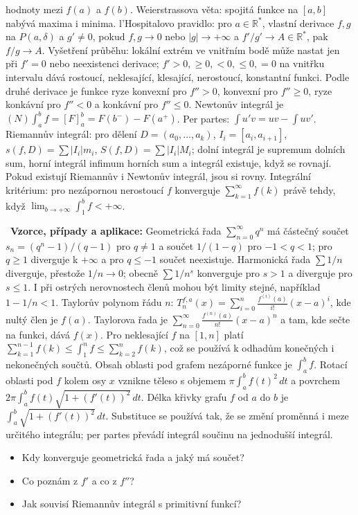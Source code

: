 \begin{odpoved}
hodnoty mezi $f(a)$ a $f(b)$. Weierstrassova věta: spojitá funkce na $[a,b]$ nabývá
maxima i minima. l'Hospitalovo pravidlo: pro $a\in\mathbb R^*$, vlastní derivace
$f,g$ na $P(a,\delta)$ a $g'\ne0$, pokud $f,g\to0$ nebo $|g|\to+\infty$ a
$f'/g'\to A\in\mathbb R^*$, pak $f/g\to A$. Vyšetření průběhu: lokální extrém ve
vnitřním bodě může nastat jen při $f'=0$ nebo neexistenci derivace; $f'>0,\ge0,<0,\le0,=0$
na vnitřku intervalu dává rostoucí, neklesající, klesající, nerostoucí, konstantní funkci.
Podle druhé derivace je funkce ryze konvexní pro $f''>0$, konvexní pro $f''\ge0$,
ryze konkávní pro $f''<0$ a konkávní pro $f''\le0$. Newtonův integrál je
$(N)\int_a^b f=[F]_a^b=F(b^-)-F(a^+)$. Per partes: $\int u'v=uv-\int uv'$.
Riemannův integrál: pro dělení $D=(a_0,\ldots,a_k)$, $I_i=[a_i,a_{i+1}]$,
$s(f,D)=\sum |I_i|m_i$, $S(f,D)=\sum |I_i|M_i$; dolní integrál je supremum dolních sum,
horní integrál infimum horních sum a integrál existuje, když se rovnají. Pokud existují
Riemannův i Newtonův integrál, jsou si rovny. Integrální kritérium: pro nezápornou
nerostoucí $f$ konverguje $\sum_{k=1}^{\infty} f(k)$ právě tehdy, když
$\lim_{b\to+\infty}\int_1^b f<+\infty$.\par
\noindent{}\ \textbf{Vzorce, případy a aplikace:} Geometrická řada
$\sum_{n=0}^{\infty}q^n$ má částečný součet $s_n=(q^n-1)/(q-1)$ pro $q\ne1$ a součet
$1/(1-q)$ pro $-1<q<1$; pro $q\ge1$ diverguje k $+\infty$ a pro $q\le-1$ součet
neexistuje. Harmonická řada $\sum 1/n$ diverguje, přestože $1/n\to0$; obecně
$\sum 1/n^s$ konverguje pro $s>1$ a diverguje pro $s\le1$. I při ostrých nerovnostech
členů mohou být limity stejné, například $1-1/n<1$. Taylorův polynom řádu $n$:
$T_n^{f,a}(x)=\sum_{i=0}^n\frac{f^{(i)}(a)}{i!}(x-a)^i$, kde nultý člen je $f(a)$.
Taylorova řada je $\sum_{n=0}^{\infty}\frac{f^{(n)}(a)}{n!}(x-a)^n$ a tam, kde sečte
na funkci, dává $f(x)$. Pro neklesající $f$ na $[1,n]$ platí
$\sum_{k=1}^{n-1}f(k)\le\int_1^n f\le\sum_{k=2}^{n}f(k)$, což se používá k odhadům
konečných i nekonečných součtů. Obsah oblasti pod grafem nezáporné funkce je
$\int_a^b f$. Rotací oblasti pod $f$ kolem osy $x$ vznikne těleso s objemem
$\pi\int_a^b f(t)^2\,dt$ a povrchem
$2\pi\int_a^b f(t)\sqrt{1+(f'(t))^2}\,dt$. Délka křivky grafu $f$ od $a$ do $b$ je
$\int_a^b\sqrt{1+(f'(t))^2}\,dt$. Substituce se používá tak, že se změní proměnná i
meze určitého integrálu; per partes převádí integrál součinu na jednodušší integrál.
\end{odpoved}
\begin{recall}
\begin{itemize}[leftmargin=1.2em,itemsep=0pt,topsep=1pt]
  \item Kdy konverguje geometrická řada a jaký má součet?
  \item Co poznám z $f'$ a co z $f''$?
  \item Jak souvisí Riemannův integrál s primitivní funkcí?
\end{itemize}
\end{recall}

